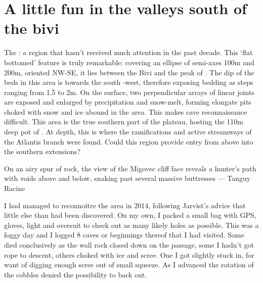 \section{A little fun in the valleys south of the bivi}

\begin{marginfigure}
\end{marginfigure}

The : a region that hasn’t received much attention in the past decade. This ‘flat bottomed’ feature is truly remarkable: covering an ellipse of semi-axes 100m and 200m, oriented NW-SE, it lies between the Bivi and the peak of . The dip of the beds in this area is towards the south -west, therefore exposing bedding as steps ranging from 1.5 to 2m. On the surface, two perpendicular arrays of linear joints are exposed and enlarged by precipitation and snow-melt, forming elongate pits choked with snow and ice abound in the area. This makes cave reconnaissance difficult. This area is the true southern part of the plateau, hosting the 110m deep pot of .  At depth, this is where the ramifications and active streamways of the Atlantis branch were found. Could this region provide entry from above into the southern extensions?

\begin{marginfigure}
\centering
{}
\label{migface}
\caption{On an airy spur of rock, the view of the Migovec cliff face reveals a hunter's path with voids above and below, snaking past several massive buttresses --- Tanguy Racine}
\end{marginfigure}

I had managed to reconnoitre the area in 2014, following Jarvist’s advice that little else than  had been discovered. On my own, I packed a small bag with GPS, gloves, light and oversuit to check out as many likely holes as possible. This was a foggy day and I logged 8 caves or beginnings thereof that I had visited. Some died conclusively as the wall rock closed down on the passage, some I hadn’t got rope to descent, others choked with ice and scree. One I got slightly stuck in, for want of digging enough scree out of small squeeze. As I advanced the rotation of the cobbles denied the possibility to back out. 

